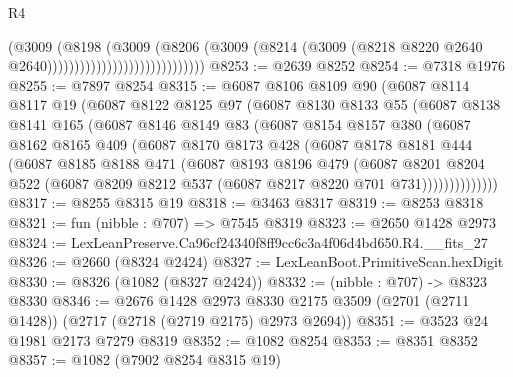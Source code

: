 \begin{lexlean}{R4}
\begin{coremodule}
                                              (@3009
                                                (@8198
                                                  (@3009
                                                    (@8206
                                                      (@3009
                                                        (@8214
                                                          (@3009
                                                            (@8218
                                                              @8220
                                                              @2640
                                                              @2640)))))))))))))))))))))))))))))
@8253 := @2639 @8252
@8254 := @7318 @1976
@8255 := @7897 @8254
@8315 := @6087
    @8106
    @8109
    @90
    (@6087
      @8114
      @8117
      @19
      (@6087
        @8122
        @8125
        @97
        (@6087
          @8130
          @8133
          @55
          (@6087
            @8138
            @8141
            @165
            (@6087
              @8146
              @8149
              @83
              (@6087
                @8154
                @8157
                @380
                (@6087
                  @8162
                  @8165
                  @409
                  (@6087
                    @8170
                    @8173
                    @428
                    (@6087
                      @8178
                      @8181
                      @444
                      (@6087
                        @8185
                        @8188
                        @471
                        (@6087
                          @8193
                          @8196
                          @479
                          (@6087
                            @8201
                            @8204
                            @522
                            (@6087 @8209 @8212 @537 (@6087 @8217 @8220 @701 @731))))))))))))))
@8317 := @8255 @8315 @19
@8318 := @3463 @8317
@8319 := @8253 @8318
@8321 := fun (nibble : @707) => @7545 @8319
@8323 := @2650 @1428 @2973
@8324 := LexLeanPreserve.Ca96cf24340f8ff9cc6c3a4f06d4bd650.R4.__fits_27
@8326 := @2660 (@8324 @2424)
@8327 := LexLeanBoot.PrimitiveScan.hexDigit
@8330 := @8326 (@1082 (@8327 @2424))
@8332 := (nibble : @707) -> @8323 @8330
@8346 := @2676
    @1428
    @2973
    @8330
    @2175
    @3509
    (@2701 (@2711 @1428))
    (@2717 (@2718 (@2719 @2175) @2973 @2694))
@8351 := @3523 @24 @1981 @2173 @7279 @8319
@8352 := @1082 @8254
@8353 := @8351 @8352
@8357 := @1082 (@7902 @8254 @8315 @19)

\end{coremodule}
\end{lexlean}
